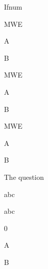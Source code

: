 \documentclass{article}
\begin{document}
\begin{quiz}{Ifnum}
\begin{multi}{MWE}
\item* A
\item B
\end{multi}
\begin{multi}[points=.5]{MWE}
\item* A
\item B
\end{multi}
\begin{multi}[points=3.2]{MWE}
\item* A
\item B
\end{multi}
\begin{cloze}{The question}
\begin{shortanswer}[points=3]\item abc\end{shortanswer}
\begin{shortanswer}[points=-0.49]\item abc\end{shortanswer}
\begin{numerical}[points=1.49]\item 0\end{numerical}
\begin{multi}[default grade=1.51]\item* A\item B\end{multi}
\end{cloze}
\end{quiz}
\end{document}
